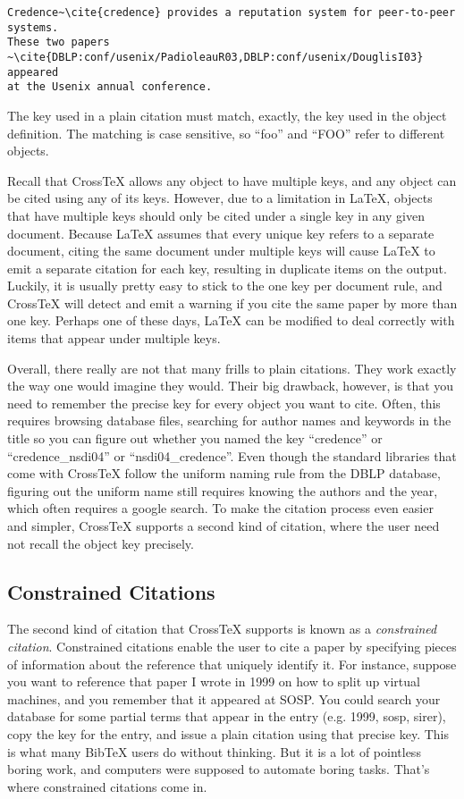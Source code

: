 \documentclass{article}
\newcommand{\XTeX}{Cross\TeX}
\begin{document}
\begin{small}\begin{verbatim}
Credence~\cite{credence} provides a reputation system for peer-to-peer systems.
These two papers ~\cite{DBLP:conf/usenix/PadioleauR03,DBLP:conf/usenix/DouglisI03} appeared
at the Usenix annual conference.
\end{verbatim}\end{small}

The key used in a plain citation must match, exactly, the key used in the object definition. The
matching is case sensitive, so ``foo'' and ``FOO'' refer to different objects. 

Recall that \XTeX{} allows any object to have multiple keys, and any object can be 
cited using any of its keys. However, due to a limitation in LaTeX, objects that 
have multiple keys should only be cited under a single key in any given document. Because 
LaTeX assumes that every unique key refers to a separate document, citing  
the same document under multiple keys will cause LaTeX to emit a separate citation
for each key, resulting in duplicate items on the output. Luckily, it is usually pretty 
easy to stick to the one key per document rule, and \XTeX{} will detect and emit a warning
if you cite the same paper by more than one key. Perhaps one of these days, LaTeX can be
modified to deal correctly with items that appear under multiple keys.

Overall, there really are not that many frills to plain citations. They work exactly the way
one would imagine they would. Their big drawback, however, is that you need to remember
the precise key for every object you want to cite. Often, this requires browsing database
files, searching for author names and keywords in the title so you can figure out whether
you named the key ``credence'' or ``credence\_nsdi04'' or ``nsdi04\_credence''. Even though 
the standard libraries that come with \XTeX{} follow the uniform naming rule from the DBLP
database, figuring out the uniform name still requires knowing the authors and the year, which
often requires a google search.  To make the citation process even easier and simpler, \XTeX{} supports a 
second kind of citation, where the user need not recall the object key precisely.

\subsection{Constrained Citations}

The second kind of citation that \XTeX{} supports is known as a \textit{constrained citation}.
Constrained citations enable the user to cite a paper by specifying pieces of information about
the reference that uniquely identify it. For instance, suppose you want to reference 
that paper I wrote in 1999 on how to split up virtual machines, and you remember that it appeared
at SOSP. You could search your database for some partial terms that appear in the entry (e.g. 1999,
sosp, sirer), copy the key for the entry, and issue a plain citation using that precise key. This
is what many BibTeX users do without thinking.  But it is a lot of pointless boring work, and computers were  
supposed to automate boring tasks. That's where constrained citations come in. 
\end{document}

